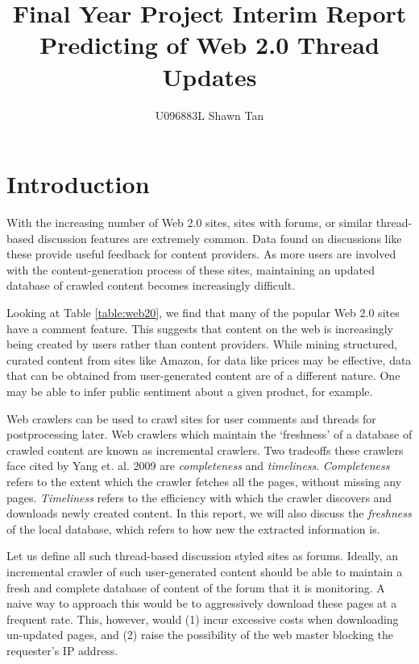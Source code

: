 \documentclass[12 pt]{article}
\title{Final Year Project Interim Report\\ Predicting of Web 2.0 Thread Updates}
\author{U096883L Shawn Tan}
\date{}
\begin{document}
\doublespacing
\maketitle
\section{Introduction}
With the increasing number of Web 2.0 sites, sites with forums, or similar thread-based discussion features are extremely common. Data found on discussions like these provide useful feedback for content providers. As more users are involved with the content-generation process of these sites, maintaining an updated database of crawled content becomes increasingly difficult.


\begin{table}\label{table:web20}
\caption{Features of popular Web 2.0 sites}
\end{table}

Looking at Table \ref{table:web20}, we find that many of the popular Web 2.0 sites have a comment feature. This suggests that content on the web is increasingly being created by users rather than content providers. While mining structured, curated content from sites like Amazon, for data like prices may be effective, data that can be obtained from user-generated content are of a different nature. One may be able to infer public sentiment about a given product, for example.

Web crawlers can be used to crawl sites for user comments and threads for postprocessing later. Web crawlers which maintain the `freshness' of a database of crawled content are known as incremental crawlers. Two tradeoffs these crawlers face cited by Yang et. al. 2009 \cite{Yang2009} are \emph{completeness} and \emph{timeliness}. \emph{Completeness} refers to the extent which the crawler fetches all the pages, without missing any pages. \emph{Timeliness} refers to the efficiency with which the crawler discovers and downloads newly created content. In this report, we will also discuss the \emph{freshness} of the local database, which refers to how new the extracted information is.

Let us define all such thread-based discussion styled sites as forums. Ideally, an incremental crawler of such user-generated content should be able to maintain a fresh and complete database of content of the forum that it is monitoring. A naive way to approach this would be to aggressively download these pages at a frequent rate. This, however, would (1) incur excessive costs when downloading un-updated pages, and (2) raise the possibility of the web master blocking the requester's IP address.
\end{document}
